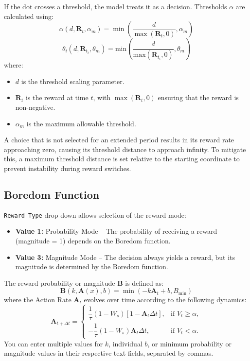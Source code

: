 If the dot crosses a threshold, the model treats it as a decision. Thresholds \(\alpha\) are calculated using:
\[
\alpha(d, \mathbf{R}_t, \alpha_m) = 
\min\left(\frac{d}{\max(\mathbf{R}_t, 0)}, \alpha_m\right)
\]
\[\theta_i(d,\mathbf{R}_{t_i},\theta_m) = \mathrm{min} \left( \frac{d}{\mathrm{max}(\mathbf{R}_{t_i},0)}, \theta_m \right)\]
where:
\begin{itemize}
    \item \(d\) is the threshold scaling parameter.
    \item \(\mathbf{R}_t\) is the reward at time \(t\), with \(\max(\mathbf{R}_t, 0)\) ensuring that the reward is non-negative.
    \item \(\alpha_m\) is the maximum allowable threshold.
\end{itemize}
A choice that is not selected for an extended period results in its reward rate approaching zero, causing its threshold distance to approach infinity. To mitigate this, a maximum threshold distance is set relative to the starting coordinate to prevent instability during reward switches.

\subsection{Boredom Function}
\texttt{Reward Type} drop down allows selection of the reward mode:
    \begin{itemize}
        \item \textbf{Value 1:} Probability Mode – The probability of receiving a reward (magnitude = 1) depends on the Boredom function.
        \item \textbf{Value 3:} Magnitude Mode – The decision always yields a reward, but its magnitude is determined by the Boredom function.
    \end{itemize}

The reward probability or magnitude \(\mathbf{B}\) is defined as:
\[	
\mathbf{B}(k, \mathbf{A}(x), b) = \min\left(-k \mathbf{A}_t + b, B_{\min} \right)
\]
where the Action Rate \(\mathbf{A}_t\) evolves over time according to the following dynamics:
\[
\mathbf{A}_{t+ \Delta t} = 
\begin{cases}
    \dfrac{1}{\tau} (1 - W_s) \left[ 1 - \mathbf{A}_t \Delta t \right], 
    & \text{if } V_t \geq \alpha, \\[12pt]
    -\dfrac{1}{\tau} (1 - W_s) \mathbf{A}_t \Delta t, 
    & \text{if } V_t < \alpha.
\end{cases}
\]
You can enter multiple values for \(k\), individual \(b\), or minimum probability or magnitude values in their respective text fields, separated by commas.

